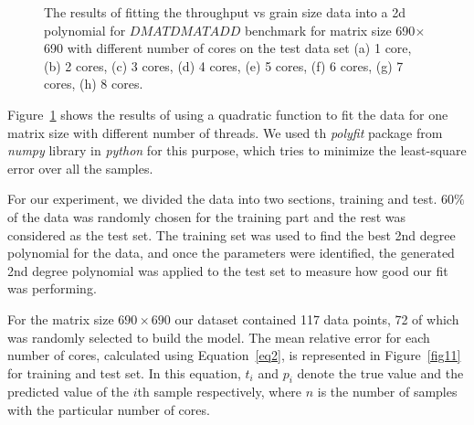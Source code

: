 \begin{figure}[H]
							
	\caption{The results of fitting the throughput vs grain size data into a 2d polynomial for $DMATDMATADD$ benchmark for matrix size 690$\times$690 with different number of cores on the test data set (a) 1 core, (b) 2 cores, (c) 3 cores, (d) 4 cores, (e) 5 cores, (f) 6 cores, (g) 7 cores, (h) 8 cores.}	
	\label{fig10}
\end{figure}


\vspace{\baselineskip}	
Figure~\ref{fig10} shows the results of using a quadratic function to fit the data for one matrix size with different number of threads. We used th \textit{polyfit} package from \textit{numpy} library in \textit{python} for this purpose, which tries to minimize the least-square error over all the samples.  

For our experiment, we divided the data into two sections, training and test. $60\%$ of the data was randomly chosen for the training part and the rest was considered as the test set. The training set was used to find the best 2nd degree polynomial for the data, and once the parameters were identified, the generated 2nd degree polynomial was applied to the test set to measure how good our fit was performing. 

For the matrix size $690\times690$ our dataset contained 117 data points, 72 of which was randomly selected to build the model. The mean relative error for each number of cores, calculated using Equation~\ref{eq2}, is represented in Figure~\ref{fig11} for training and test set. In this equation, $t_i$ and $p_i$ denote the true value and the predicted value of the $i$th sample respectively, where $n$ is the number of samples with the particular number of cores. 

